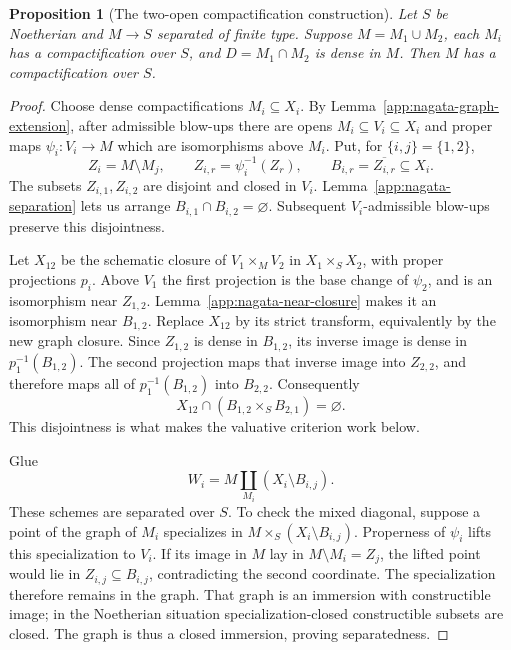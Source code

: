 \documentclass[11pt,a4paper]{article}
\numberwithin{equation}{section}
\newtheorem{proposition}[theorem]{Proposition}
\theoremstyle{definition}
\theoremstyle{remark}
\begin{document}
\begin{proposition}[The two-open compactification construction]
\label{app:nagata-two-open}
Let $S$ be Noetherian and $M\to S$ separated of finite type.
Suppose $M=M_1\cup M_2$, each $M_i$ has a compactification over
$S$, and $D=M_1\cap M_2$ is dense in $M$. Then $M$ has a
compactification over $S$.
\end{proposition}

\begin{proof}
Choose dense compactifications $M_i\subseteq X_i$. By
Lemma~\ref{app:nagata-graph-extension}, after admissible blow-ups
there are opens $M_i\subseteq V_i\subseteq X_i$ and proper maps
$\psi_i:V_i\to M$ which are isomorphisms above $M_i$.
Put, for $\{i,j\}=\{1,2\}$,
\[
 Z_i=M\setminus M_j,\qquad
 Z_{i,r}=\psi_i^{-1}(Z_r),\qquad
 B_{i,r}=\overline{Z_{i,r}}\subseteq X_i.
\]
The subsets $Z_{i,1},Z_{i,2}$ are disjoint and closed in $V_i$.
Lemma~\ref{app:nagata-separation} lets us arrange
$B_{i,1}\cap B_{i,2}=\varnothing$. Subsequent $V_i$-admissible
blow-ups preserve this disjointness.

Let $X_{12}$ be the schematic closure of
$V_1\times_MV_2$ in $X_1\times_SX_2$, with proper projections
$p_i$. Above $V_1$ the first projection is the base change of
$\psi_2$, and is an isomorphism near $Z_{1,2}$.
Lemma~\ref{app:nagata-near-closure} makes it an isomorphism near
$B_{1,2}$. Replace $X_{12}$ by its strict transform, equivalently
by the new graph closure. Since $Z_{1,2}$ is dense in $B_{1,2}$,
its inverse image is dense in $p_1^{-1}(B_{1,2})$. The second
projection maps that inverse image into $Z_{2,2}$, and therefore
maps all of $p_1^{-1}(B_{1,2})$ into $B_{2,2}$. Consequently
\begin{equation}
 X_{12}\cap(B_{1,2}\times_SB_{2,1})=\varnothing.
 \label{app:nagata-key-disjointness}
\end{equation}
This disjointness is what makes the valuative criterion work below.

Glue
\[
 W_i=M\coprod_{M_i}(X_i\setminus B_{i,j}).
\]
These schemes are separated over $S$. To check the mixed diagonal,
suppose a point of the graph of $M_i$ specializes in
$M\times_S(X_i\setminus B_{i,j})$. Properness of $\psi_i$
lifts this specialization to $V_i$. If its image in $M$ lay in
$M\setminus M_i=Z_j$, the lifted point would lie in
$Z_{i,j}\subseteq B_{i,j}$, contradicting the second coordinate.
The specialization therefore remains in the graph. That graph is
an immersion with constructible image; in the Noetherian situation
specialization-closed constructible subsets are closed. The graph
is thus a closed immersion, proving separatedness.


\end{proof}
\end{document}
